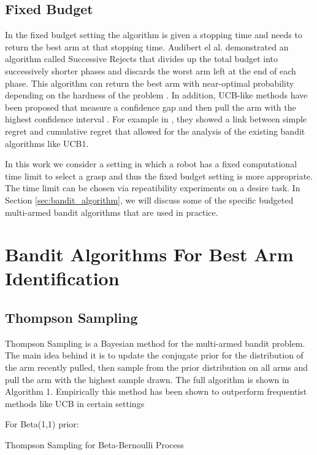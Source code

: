 \documentclass[letterpaper, 10 pt, conference]{ieeeconf}  %
\begin{document}
\subsection{Fixed Budget}
In the fixed budget setting the algorithm is given a stopping time and needs to return the best arm at that stopping time. Audibert el al. demonstrated an algorithm called Successive Rejects that divides up the total budget into successively shorter phases and discards the worst arm left at the end of each phase. This algorithm can return the best arm with near-optimal probability depending on the hardness of the problem \cite{audibert2010best}. In addition, UCB-like methods have been proposed that measure a confidence gap and then pull the arm with the highest confidence interval \cite{gabillon2012best}. For example in \cite{bubeck2009pure}, they showed a link between simple regret and cumulative regret that allowed for the analysis of the existing bandit algorithms like UCB1.

In  this work we consider a setting in which a robot has a fixed computational time limit to select a grasp and thus the fixed budget setting is more appropriate. The time limit can be chosen via repeatibility experiments on a desire task. In Section \ref{sec:bandit_algorithm}, we will discuss some of the specific budgeted multi-armed bandit algorithms that are used in practice. 

\label{sec:bandit_algorithm}
\section{Bandit Algorithms For Best Arm Identification}\label{sec:algorithms}
\subsection{Thompson Sampling}
Thompson Sampling is a Bayesian method for the multi-armed bandit problem. The main idea behind it is to update the conjugate prior for the distribution of the arm recently pulled, then sample from the prior distribution on all arms and pull the arm with the highest sample drawn. The full algorithm is shown in Algorithm 1.  Empirically this method has been shown to outperform frequentist methods like UCB in certain settings \cite{chapelle2011empirical} 

\begin{algorithm}
 For Beta(1,1) prior: \\
 \caption{Thompson Sampling for Beta-Bernoulli Process}
\end{algorithm}
\end{document}
